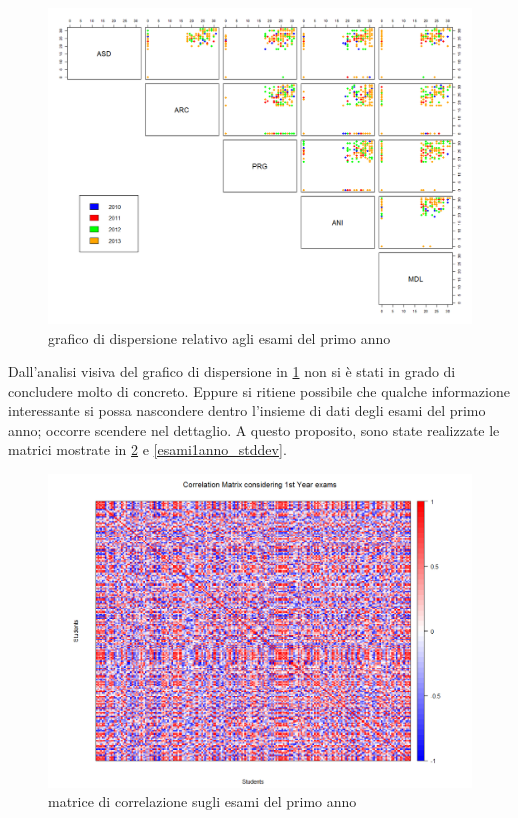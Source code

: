                 \begin{figure}
                    \centering
                    \caption{grafico di dispersione relativo agli esami del primo anno}
                    \label{esami1anno_sp}
                	\includegraphics[scale=0.32]{img/scatter_plot_4_gen.png}
                \end{figure}

                Dall’analisi visiva del grafico di dispersione in \ref{esami1anno_sp} non si è stati in grado di concludere molto di concreto. Eppure si ritiene possibile che qualche informazione interessante si possa nascondere dentro l’insieme di dati degli esami del primo anno; occorre scendere nel dettaglio. A questo proposito, sono state realizzate le matrici mostrate in \ref{esami1anno_corr} e \ref{esami1anno_stddev}.

                \begin{figure}
                    \centering
                    \caption{matrice di correlazione sugli esami del primo anno}
                    \label{esami1anno_corr}
                	\includegraphics[scale=0.32]{img/corr_matrix_1.png}
                \end{figure}

